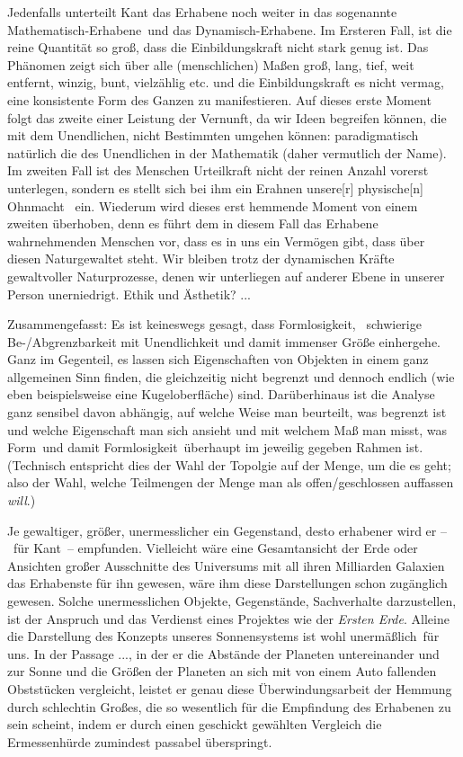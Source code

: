 Jedenfalls unterteilt Kant das Erhabene noch weiter in das sogenannte \glqq
  Mathematisch-Erhabene\grqq\ und das \glqq Dynamisch-Erhabene\grqq.
Im Ersteren Fall, ist die reine Quantität so groß, dass die Einbildungskraft
  nicht stark genug ist. Das Phänomen zeigt sich über alle (menschlichen) Maßen
  groß, lang, tief, weit entfernt, winzig, bunt, vielzählig etc. und die
  Einbildungskraft es nicht vermag, eine konsistente Form des Ganzen zu
  manifestieren.
Auf dieses erste Moment folgt das zweite einer Leistung der Vernunft, da wir
  Ideen begreifen können, die mit dem Unendlichen, nicht Bestimmten umgehen
  können: paradigmatisch natürlich die des Unendlichen in der Mathematik
  (daher vermutlich der Name).
Im zweiten Fall ist des Menschen Urteilkraft nicht der reinen Anzahl vorerst
  unterlegen, sondern es stellt sich bei ihm ein Erahnen \glqq unsere[r]
  physische[n] Ohnmacht\grqq\ \citep[S. 261 f. ??]{Kant1790} ein.
Wiederum wird dieses erst hemmende Moment von einem zweiten überhoben, denn es
  führt dem in diesem Fall das Erhabene wahrnehmenden Menschen vor, dass es in
  uns ein Vermögen gibt, dass über diesen Naturgewaltet steht.
Wir bleiben trotz der dynamischen Kräfte gewaltvoller Naturprozesse, denen wir
  unterliegen auf anderer Ebene \glqq in unserer Person unerniedrigt\grqq.
Ethik und Ästhetik? ...

Zusammengefasst: Es ist keineswegs gesagt, dass Formlosigkeit, \dhei\ schwierige
  Be-/Abgrenzbarkeit mit Unendlichkeit und damit immenser Größe einhergehe.
Ganz im Gegenteil, es lassen sich Eigenschaften von Objekten in einem ganz
  allgemeinen Sinn finden, die gleichzeitig nicht begrenzt und dennoch endlich
  (wie eben beispielsweise eine Kugeloberfläche) sind.
Darüberhinaus ist die Analyse ganz sensibel davon abhängig, auf welche Weise
  man beurteilt, was begrenzt ist und welche Eigenschaft man sich ansieht und
  mit welchem Maß man misst, was \glqq Form\grqq\ und damit \glqq
  Formlosigkeit\grqq\ überhaupt im jeweilig gegeben Rahmen ist. (Technisch
  entspricht dies der Wahl der Topolgie auf der Menge, um die es geht; also
  der Wahl, welche Teilmengen der Menge man als offen/geschlossen auffassen
  \emph{will}.)

Je gewaltiger, größer, unermesslicher ein Gegenstand, desto erhabener wird er
  --~für Kant~-- empfunden.
Vielleicht wäre eine Gesamtansicht der Erde oder Ansichten großer Ausschnitte
  des Universums mit all ihren Milliarden Galaxien das Erhabenste für ihn
  gewesen, wäre ihm diese Darstellungen schon zugänglich gewesen.
Solche unermesslichen Objekte, Gegenstände, Sachverhalte darzustellen, ist der
  Anspruch und das Verdienst eines Projektes wie der \emph{Ersten Erde}.
Alleine die Darstellung des Konzepts unseres Sonnensystems ist wohl \glqq
  unermäßlich\grqq\ für uns.
In der Passage ..., in der er die Abstände der Planeten untereinander und zur
  Sonne und die Größen der Planeten an sich mit von einem Auto fallenden
  Obststücken vergleicht, leistet er genau diese Überwindungsarbeit der
  Hemmung durch \glqq schlechtin Großes\grqq, die so wesentlich für die
  Empfindung des Erhabenen zu sein scheint, indem er durch einen geschickt
  gewählten Vergleich die Ermessenhürde zumindest passabel überspringt.

